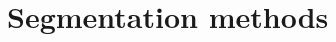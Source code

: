 \documentclass[10pt]{beamer}
\newcommand{\emphase}[1]{\textcolor{darkred}{#1}}
\newcommand{\paragraph}[1]{\textcolor{darkred}{#1}}
\newcommand{\Rbb}{\mathbb{R}}
\newcommand{\ra}{\emphase{$\rightarrow$~}}
\begin{document}
% 
% 
%   
% 

\section{Segmentation methods}

\end{document}
